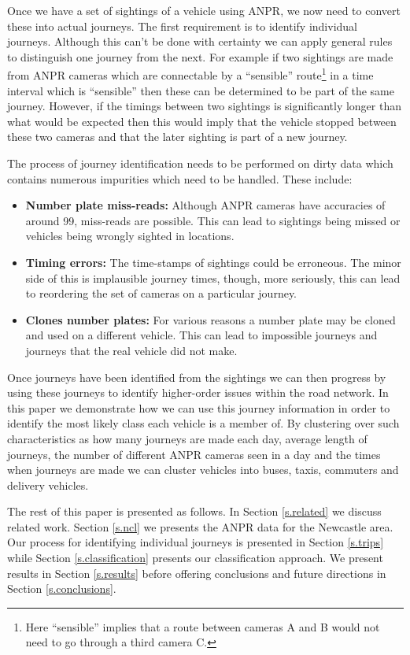 Once we have a set of sightings of a vehicle using ANPR, we now need to convert these into actual journeys. The first requirement is to identify individual journeys. Although this can't be done with certainty we can apply general rules to distinguish one journey from the next. For example if two sightings are made from ANPR cameras which are connectable by a ``sensible'' route\footnote{Here ``sensible'' implies that a route between cameras A and B would not need to go through a third camera C.} in a time interval which is ``sensible'' then these can be determined to be part of the same journey. However, if the timings between two sightings is significantly longer than what would be expected then this would imply that the vehicle stopped between these two cameras and that the later sighting is part of a new journey.

The process of journey identification needs to be performed on dirty data which contains numerous impurities which need to be handled. These include:

\begin{itemize}
	\item {\bf Number plate miss-reads:} Although ANPR cameras have accuracies of around 99, miss-reads are possible. This can lead to sightings being missed or vehicles being wrongly sighted in locations.
	\item {\bf Timing errors:} The time-stamps of sightings could be erroneous. The minor side of this is implausible journey times, though, more seriously, this can lead to reordering the set of cameras on a particular journey.
	\item {\bf Clones number plates:} For various reasons a number plate may be cloned and used on a different vehicle. This can lead to impossible journeys and journeys that the real vehicle did not make.
\end{itemize}

Once journeys have been identified from the sightings we can then progress by using these journeys to identify higher-order issues within the road network. In this paper we demonstrate how we can use this journey information in order to identify the most likely class each vehicle is a member of. By clustering over such characteristics as how many journeys are made each day, average length of journeys, the number of different ANPR cameras seen in a day and the times when journeys are made we can cluster vehicles into buses, taxis, commuters and delivery vehicles.

The rest of this paper is presented as follows. In Section \ref{s.related} we discuss related work. Section \ref{s.ncl} we presents the ANPR data for the Newcastle area. Our process for identifying individual journeys is presented in Section \ref{s.trips} while Section \ref{s.classification} presents our classification approach. We present results in Section \ref{s.results} before offering conclusions and future directions in Section \ref{s.conclusions}.


